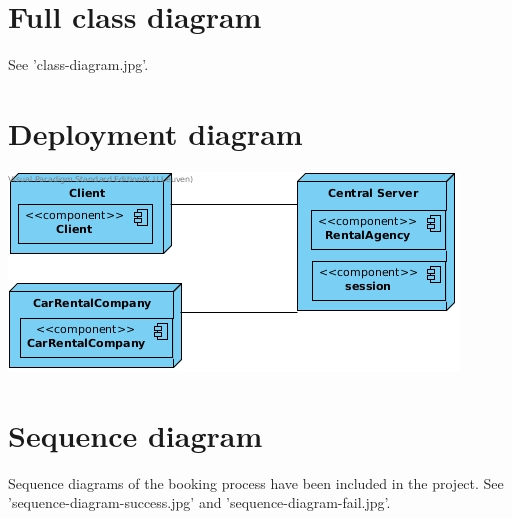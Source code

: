 \documentclass{scrartcl}
\begin{document}
	\section{Full class diagram}
    See 'class-diagram.jpg'.

	\section{Deployment diagram}
    \includegraphics{deployment-diagram.jpg}

    \section{Sequence diagram}
    Sequence diagrams of the booking process have been included in the project.
    See 'sequence-diagram-success.jpg' and 'sequence-diagram-fail.jpg'.

\end{document}
